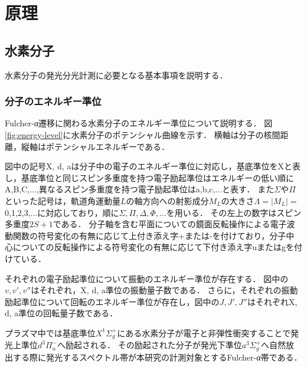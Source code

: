 \chapter{原理}

\section{水素分子}
水素分子の発光分光計測に必要となる基本事項を説明する．
\subsection{分子のエネルギー準位}
Fulcher-α遷移に関わる水素分子のエネルギー準位について説明する．
図\ref{fig:energy-level}に水素分子のポテンシャル曲線を示す．
横軸は分子の核間距離，縦軸はポテンシャルエネルギーである．

図中の記号X, d, aは分子中の電子のエネルギー準位に対応し，基底準位をXと表し，基底準位と同じスピン多重度を持つ電子励起準位はエネルギーの低い順にA,B,C,...,異なるスピン多重度を持つ電子励起準位はa,b,c,...と表す．
また$\Sigma$や$\Pi$といった記号は，軌道角運動量$L$の軸方向への射影成分$M_L$の大きさ$\Lambda = |M_L|=$0,1,2,3,...に対応しており，順に$\Sigma,\Pi,\Delta,\Phi,...$を用いる\cite{bunsibunko-no-kiso}．
その左上の数字はスピン多重度$2S+1$である\cite{bunsibunko-no-kiso}．
分子軸を含む平面についての鏡面反転操作による電子波動関数の符号変化の有無に応じて上付き添え字+または-を付けており，分子中心についての反転操作による符号変化の有無に応じて下付き添え字uまたはgを付けている\cite{bunsibunko-no-kiso}．

それぞれの電子励起準位について振動のエネルギー準位が存在する．
図中の$v, v', v''$はそれぞれ，X, d, a準位の振動量子数である．
さらに，それぞれの振動励起準位について回転のエネルギー準位が存在し，図中の$J, J', J''$はそれぞれX, d, a準位の回転量子数である．

プラズマ中では基底準位$X^1 \Sigma^+_g$にある水素分子が電子と非弾性衝突することで発光上準位$d^3 \Pi^-_u$へ励起される．
その励起された分子が発光下準位$a^3 \Sigma^+_g$へ自然放出する際に発光するスペクトル帯が本研究の計測対象とするFulcher-α帯である．

